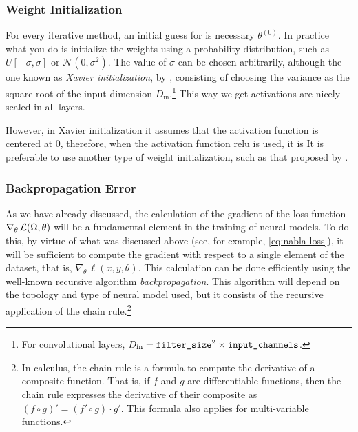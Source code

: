 \subsubsection{Weight Initialization}

For every iterative method, an initial guess for is necessary
\(\theta^{(0)}\). In practice what you do is initialize the weights using a
probability distribution, such as \(U[-\sigma, \sigma]\) or
\(\mathcal{N}(0, \sigma^2)\). The value of \(\sigma\) can be chosen
arbitrarily, although the one known as \emph{Xavier initialization}, by
, consisting of choosing the variance as the square root
of the input dimension \(D_{\text{in}}\).\footnote{For convolutional layers,
  \(D_{\text{in}} = \text{\texttt{filter\_size}}^2 \times
  \text{\texttt{input\_channels}}\).} This way we get activations are nicely
scaled in all layers.

However, in Xavier initialization it assumes that the activation function is
centered at 0, therefore, when the activation function \gls{relu} is used, it
is It is preferable to use another type of weight initialization, such as that
proposed by .

\subsubsection{Backpropagation Error}

As we have already discussed, the calculation of the gradient of the loss
function \(\nabla _{\theta}\,\mathcal{L} (\Omega, \theta)\) will be a fundamental
element in the training of neural models. To do this, by virtue of what was
discussed above (see, for example, \vref{eq:nabla-loss}), it will be sufficient
to compute the gradient with respect to a single element of the dataset, that
is, \(\nabla _{\theta }\,\ell (x, y, \theta)\). This calculation can be done
efficiently using the well-known recursive algorithm
\emph{backpropagation}. This algorithm will depend on the topology and type of
neural model used, but it consists of the recursive application of the chain
rule.\footnote{In calculus, the chain rule is a formula to compute the
  derivative of a composite function. That is, if \(f\) and \(g\) are
  differentiable functions, then the chain rule expresses the derivative of
  their composite as \((f\circ g)' = (f'\circ g)\cdot g'\). This formula also
  applies for multi-variable functions.}

